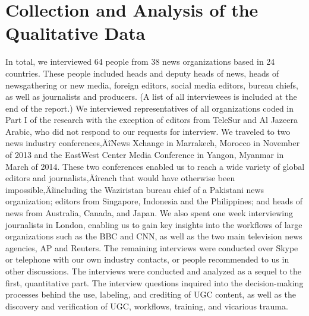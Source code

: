 \documentclass[symmetric, notoc, nobib]{towcenter-book}
\begin{document}
\section{Collection and Analysis of the Qualitative Data}
In total, we interviewed 64 people from 38 news organizations based in 24
countries. These people included heads and deputy heads of news, heads of
newsgathering or new media, foreign editors, social media editors, bureau
chiefs, as well as journalists and producers. (A list of all interviewees is
included at the end of the report.)
We interviewed representatives of all organizations coded in Part I of the
research with the exception of editors from TeleSur and Al Jazeera Arabic,
who did not respond to our requests for interview.
We traveled to two news industry conferences‚ÄîNews Xchange in Marrakech,
Morocco in November of 2013 and the EastWest Center Media
Conference in Yangon, Myanmar in March of 2014. These two conferences
enabled us to reach a wide variety of global editors and journalists‚Äîreach
that would have otherwise been impossible‚Äîincluding the Waziristan
bureau chief of a Pakistani news organization; editors from Singapore,
Indonesia and the Philippines; and heads of news from Australia, Canada,
and Japan. We also spent one week interviewing journalists in London,
enabling us to gain key insights into the workflows of large organizations
such as the BBC and CNN, as well as the two main television news agencies,
AP and Reuters.
The remaining interviews were conducted over Skype or telephone
with our own industry contacts, or people recommended to us in
other discussions.
The interviews were conducted and analyzed as a sequel to the first, quantitative
part. The interview questions inquired into the decision-making
processes behind the use, labeling, and crediting of UGC content, as
well as the discovery and verification of UGC, workflows, training, and
vicarious trauma.
\end{document}
